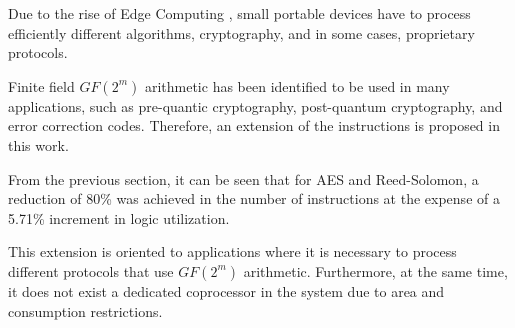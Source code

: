 Due to the rise of Edge Computing \cite{7488250}, small portable devices have to process efficiently different algorithms, cryptography, 
and in some cases, proprietary protocols.

Finite field $GF(2^m)$ arithmetic has been identified to be used in many applications, such as pre-quantic cryptography, 
post-quantum cryptography, and error correction codes. Therefore, an extension of the instructions is proposed in this work.

From the previous section, it can be seen that for AES and Reed-Solomon, a reduction of 80\% was achieved 
in the number of instructions at the expense of a 5.71\% increment in logic utilization.

This extension is oriented to applications where it is necessary to process different protocols that use $GF(2^m)$ arithmetic. 
Furthermore, at the same time, it does not exist a dedicated coprocessor in the system due to area and consumption restrictions.